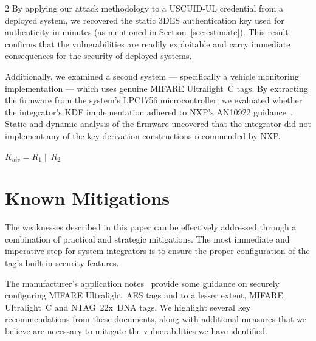 \documentclass[10pt,letterpaper]{article}
\begin{document}
\begin{multicols}{2}
By applying our attack methodology to a USCUID-UL credential from a deployed system, we recovered the static 3DES authentication key used for authenticity in minutes (as mentioned in Section~\ref{sec:estimate}). This result confirms that the vulnerabilities are readily exploitable and carry immediate consequences for the security of deployed systems.

Additionally, we examined a second system --- specifically a vehicle monitoring implementation --- which uses genuine MIFARE Ultralight~C tags. By extracting the firmware from the system's LPC1756 microcontroller, we evaluated whether the integrator's KDF implementation adhered to NXP's AN10922 guidance~\cite{nxp_an10922}. Static and dynamic analysis of the firmware uncovered that the integrator did not implement any of the key-derivation constructions recommended by NXP.

\makeatletter
\renewcommand{\fnum@algocf}{Vehicle Monitoring}
\makeatother
\newcommand{\TDES}[1]{\ensuremath{\texttt{3DES-EDE}_{#1}}}
\begin{algorithm}[H]
\caption{\\A Custom Key Diversification Function}

\BlankLine
{}
\BlankLine
\DeriveFirst{
  $R_1 \leftarrow \TDES{K_1, K_2}(K_1 \oplus U_{pad})$\;
}
\BlankLine
\DeriveSecond {
  $R_2 \leftarrow \TDES{K_1, K_2}(K_2 \oplus R_1)$\;
}
\BlankLine
\Return $K_{div} = R_1 \parallel R_2$\;
\end{algorithm}

\section{Known Mitigations}
\label{sec:mitigations}
The weaknesses described in this paper can be effectively addressed through a combination of practical and strategic mitigations. The most immediate and imperative step for system integrators is to ensure the proper configuration of the tag's built-in security features.

The manufacturer's application notes~\cite{nxp_an12265,nxp_an13452,nxp_an12653,nxp_an12998} provide some guidance on securely configuring MIFARE Ultralight~AES tags and to a lesser extent, MIFARE Ultralight~C and NTAG~22x~DNA tags. We highlight several key recommendations from these documents, along with additional measures that we believe are necessary to mitigate the vulnerabilities we have identified.


\end{multicols}
\end{document}
